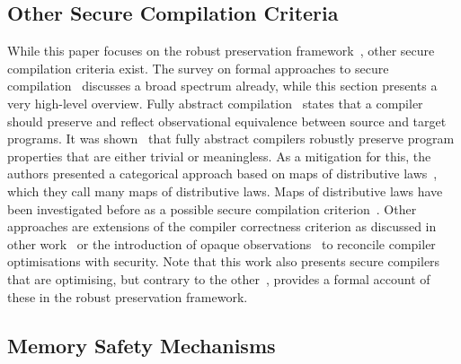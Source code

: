 \documentclass[dvipsnames,conference]{IEEEtran}
\theoremstyle{definition}
\begin{document}
\subsection{Other Secure Compilation Criteria}\label{subsec:relw:seccompcrit}

While this paper focuses on the robust preservation framework~\cite{abate2019jour}, other secure compilation criteria exist.
The survey on formal approaches to secure compilation~\cite{patrignani2019survey} discusses a broad spectrum already, while this section presents a very high-level overview.
Fully abstract compilation~\cite{abadi1999fullabstraction} states that a compiler should preserve and reflect observational equivalence between source and target programs.
It was shown~\cite{abate2021faandrc} that fully abstract compilers robustly preserve program properties that are either trivial or meaningless.
As a mitigation for this, the authors presented a categorical approach based on maps of distributive laws~\cite{watanabe2002modl}, which they call many maps of distributive laws.
Maps of distributive laws have been investigated before as a possible secure compilation criterion~\cite{tsampas2020catsc}.
Other approaches are extensions of the compiler correctness criterion as discussed in other work~\cite{patterson2019next700} or the introduction of opaque observations~\cite{vu2021reconciling} to reconcile compiler optimisations with security.
Note that this work also presents secure compilers that are optimising, but contrary to the other~\cite{vu2021reconciling}, provides a formal account of these in the robust preservation framework.

\subsection{Memory Safety Mechanisms}\label{subsec:relw:msmechs}
\end{document}
